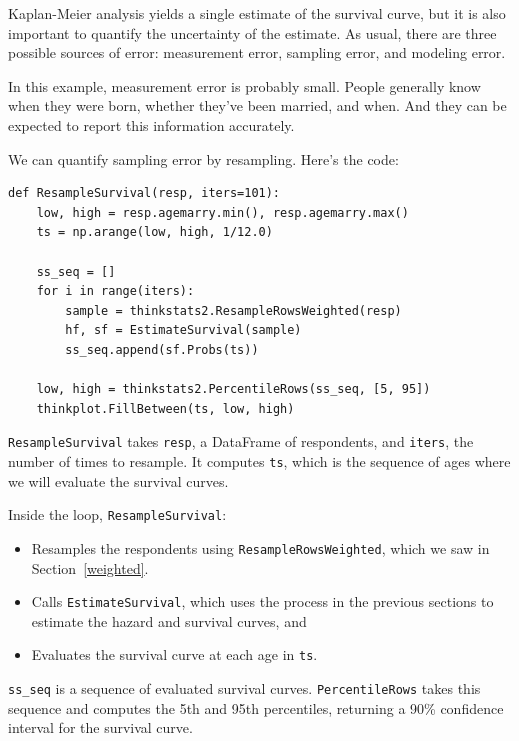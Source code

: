 \documentclass[12pt]{book}
\begin{document}
Kaplan-Meier analysis yields a single estimate of the survival curve,
but it is also important to quantify the uncertainty of the estimate.
As usual, there are three possible sources of error: measurement
error, sampling error, and modeling error.

In this example, measurement error is probably small.  People
generally know when they were born, whether they've been married, and
when.  And they can be expected to report this information accurately.

We can quantify sampling error by resampling.  Here's the code:

\begin{verbatim}
def ResampleSurvival(resp, iters=101):
    low, high = resp.agemarry.min(), resp.agemarry.max()
    ts = np.arange(low, high, 1/12.0)

    ss_seq = []
    for i in range(iters):
        sample = thinkstats2.ResampleRowsWeighted(resp)
        hf, sf = EstimateSurvival(sample)
        ss_seq.append(sf.Probs(ts))

    low, high = thinkstats2.PercentileRows(ss_seq, [5, 95])
    thinkplot.FillBetween(ts, low, high)
\end{verbatim}

\verb"ResampleSurvival" takes \verb"resp", a DataFrame of respondents,
and \verb"iters", the number of times to resample.  It computes \verb"ts",
which is the sequence of ages where we will evaluate the survival
curves.

Inside the loop, \verb"ResampleSurvival":

\begin{itemize}

\item Resamples the respondents using \verb"ResampleRowsWeighted",
which we saw in Section~\ref{weighted}.

\item Calls \verb"EstimateSurvival", which uses the process in the
previous sections to estimate the hazard and survival curves, and

\item Evaluates the survival curve at each age in \verb"ts".

\end{itemize}

\verb"ss_seq" is a sequence of evaluated survival curves.
\verb"PercentileRows" takes this sequence and computes the 5th and 95th
percentiles, returning a 90\% confidence interval for the survival
curve.
\end{document}
